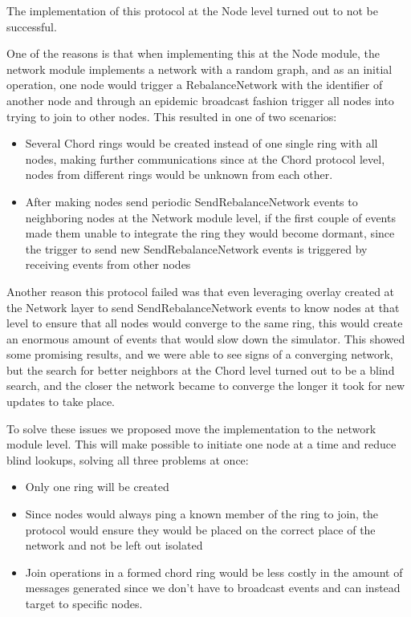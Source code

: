 The implementation of this protocol at the Node level turned out to not be successful.

One of the reasons is that when implementing this at the Node module, the network
module implements a network with a random graph, and as an initial operation, one
node would trigger a RebalanceNetwork with the identifier of another node and through
an epidemic broadcast fashion trigger all nodes into trying to join to other nodes.
This resulted in one of two scenarios:

\begin{itemize}
  \item Several Chord rings would be created instead of one single ring with all nodes,
making further communications since at the Chord protocol level, nodes from different rings
would be unknown from each other.
  \item After making nodes send periodic SendRebalanceNetwork events to neighboring
nodes at the Network module level, if the first couple of events made them unable to
integrate the ring they would become dormant, since the trigger to send  new
SendRebalanceNetwork events is triggered  by receiving events from other nodes
\end{itemize}

Another reason this protocol failed was that even leveraging overlay created at
the Network layer to send SendRebalanceNetwork events to know nodes at that level
to ensure that all nodes would converge to the same ring, this would create an enormous
amount of events that would slow down the simulator. This showed some promising results,
and we were able to see signs of a converging network, but the search for better neighbors
at the Chord level turned out to be a blind search, and the closer the network became to
converge the longer it took for new updates to take place.

To solve these issues we proposed move the implementation to the network module level.
This will make possible to initiate one node at a time and reduce blind lookups, solving
all three problems at once: 
\begin{itemize}
  \item Only one ring will be created
  \item Since nodes would always ping a known
member of the ring to join, the protocol would ensure they would be placed on the correct place
of the network and not be left out isolated
  \item Join operations in a formed chord ring would be less costly in the amount
of messages generated since we don't have to broadcast events and can instead target
to specific nodes.
\end{itemize}


